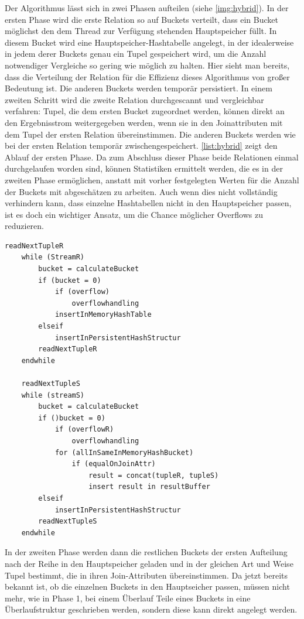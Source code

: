 \documentclass[a4paper,12pt,twoside]{article}
\begin{document}
Der Algorithmus lässt sich in zwei Phasen aufteilen (siehe \autoref{img:hybrid}). In der ersten Phase wird die erste Relation so auf Buckets verteilt, dass ein Bucket möglichst den dem Thread zur Verfügung stehenden Hauptspeicher füllt. In diesem Bucket wird eine Hauptspeicher-Hashtabelle angelegt, in der idealerweise in jedem derer Buckets genau ein Tupel gespeichert wird, um die Anzahl notwendiger Vergleiche so gering wie möglich zu halten. Hier sieht man bereits, dass die Verteilung der Relation für die Effizienz dieses Algorithmus von großer Bedeutung ist. Die anderen Buckets werden temporär persistiert. In einem zweiten Schritt wird die zweite Relation durchgescannt und vergleichbar verfahren: Tupel, die dem ersten Bucket zugeordnet werden, können direkt an den Ergebnisstrom weitergegeben werden, wenn sie in den Joinattributen mit dem Tupel der ersten Relation übereinstimmen. Die anderen Buckets werden wie bei der ersten Relation temporär zwischengespeichert. \autoref{list:hybrid} zeigt den Ablauf der ersten Phase. Da zum Abschluss dieser Phase beide Relationen einmal durchgelaufen worden sind, können Statistiken ermittelt werden, die es in der zweiten Phase ermöglichen, anstatt mit vorher festgelegten Werten für die Anzahl der Buckets mit abgeschätzen zu arbeiten. Auch wenn dies nicht vollständig verhindern kann, dass einzelne Hashtabellen nicht in den Hauptspeicher passen, ist es doch ein wichtiger Ansatz, um die Chance möglicher Overflows zu reduzieren.   

\begin{minipage}{\linewidth}
	\begin{lstlisting}[caption={Phase 1 Hybrid Hash Join}, label=list:hybrid] 
	readNextTupleR
	while (StreamR) 
	 	bucket = calculateBucket
		if (bucket = 0)
			if (overflow)
				overflowhandling
			insertInMemoryHashTable
		elseif
			insertInPersistentHashStructur
		readNextTupleR
	endwhile
	
	readNextTupleS
	while (streamS)
		bucket = calculateBucket
		if ()bucket = 0)
			if (overflowR)
				overflowhandling
			for (allInSameInMemoryHashBucket)
				if (equalOnJoinAttr)
					result = concat(tupleR, tupleS)
					insert result in resultBuffer
		elseif
			insertInPersistentHashStructur
		readNextTupleS
	endwhile
	\end{lstlisting}
\end{minipage}

In der zweiten Phase werden dann die restlichen Buckets der ersten Aufteilung nach der Reihe in den Hauptspeicher geladen und in der gleichen Art und Weise Tupel bestimmt, die in ihren Join-Attributen übereinstimmen. Da jetzt bereits bekannt ist, ob die einzelnen Buckets in den Hauptseicher passen, müssen nicht mehr, wie in Phase 1, bei einem Überlauf Teile eines Buckets in eine Überlaufstruktur geschrieben werden, sondern diese kann direkt angelegt werden.
\end{document}
